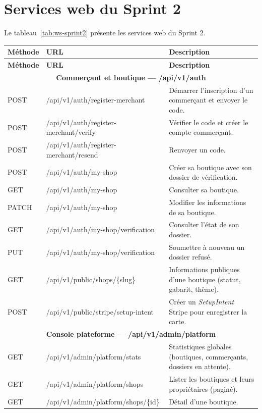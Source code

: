 \section{Services web du Sprint 2}
Le tableau~\ref{tab:ws-sprint2} présente les services web du Sprint 2.
\renewcommand{\arraystretch}{1.15}
\setlength{\tabcolsep}{4pt}
\begin{longtable}{|p{1.8cm}|p{6.8cm}|p{6.2cm}|}
\hline
\textbf{Méthode} & \textbf{URL} & \textbf{Description} \\
\hline
\endfirsthead
\hline
\textbf{Méthode} & \textbf{URL} & \textbf{Description} \\
\hline
\endhead
\multicolumn{3}{|c|}{\textbf{Commerçant et boutique --- /api/v1/auth}} \\
\hline
POST & /api/v1/auth/register-merchant & Démarrer l'inscription d'un commerçant et envoyer le code. \\
\hline
POST & /api/v1/auth/register-merchant/verify & Vérifier le code et créer le compte commerçant. \\
\hline
POST & /api/v1/auth/register-merchant/resend & Renvoyer un code. \\
\hline
POST & /api/v1/auth/my-shop & Créer sa boutique avec son dossier de vérification. \\
\hline
GET & /api/v1/auth/my-shop & Consulter sa boutique. \\
\hline
PATCH & /api/v1/auth/my-shop & Modifier les informations de sa boutique. \\
\hline
GET & /api/v1/auth/my-shop/verification & Consulter l'état de son dossier. \\
\hline
PUT & /api/v1/auth/my-shop/verification & Soumettre à nouveau un dossier refusé. \\
\hline
GET & /api/v1/public/shops/\{slug\} & Informations publiques d'une boutique (statut, gabarit, thème). \\
\hline
POST & /api/v1/public/stripe/setup-intent & Créer un \textit{SetupIntent} Stripe pour enregistrer la carte. \\
\hline
\multicolumn{3}{|c|}{\textbf{Console plateforme --- /api/v1/admin/platform}} \\
\hline
GET & /api/v1/admin/platform/stats & Statistiques globales (boutiques, commerçants, dossiers en attente). \\
\hline
GET & /api/v1/admin/platform/shops & Lister les boutiques et leurs propriétaires (paginé). \\
\hline
GET & /api/v1/admin/platform/shops/\{id\} & Détail d'une boutique. \\

\end{longtable}
